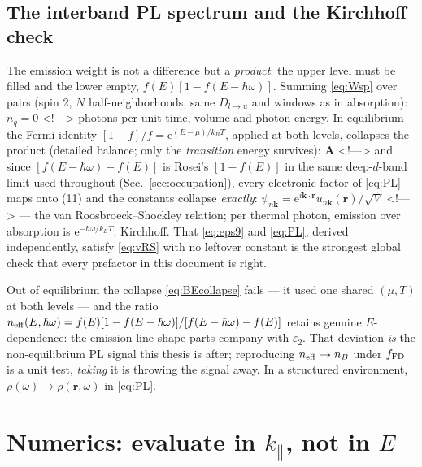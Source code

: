 \documentclass[11pt,a4paper]{article}
\numberwithin{equation}{section}
\begin{document}
\subsection{The interband PL spectrum and the Kirchhoff check}

The emission weight is not a difference but a \emph{product}: the
upper level must be filled and the lower empty,
${f}(E)[1-{f}(E-{\hbar\omega})]$.  Summing \eqref{eq:Wsp} over pairs (spin 2,
$N$ half-neighborhoods, same ${D_{l\to u}}$ and windows as in absorption):
$n_q=0$
<!--\label{eq:PL}-->
photons per unit time, volume and photon energy.  In equilibrium the
Fermi identity $[1-{f}]/{f}={\mathrm{e}}^{(E-\mu)/{k_B} T}$, applied at both
levels, collapses the product (detailed balance; only the
\emph{transition} energy survives):
$\mathbf A$
<!--\label{eq:BEcollapse}-->
and since $[{f}(E-{\hbar\omega})-{f}(E)]$ is Rosei's $[1-{f}(E)]$ in the same
deep-$d$-band limit used throughout (Sec.~\ref{sec:occupation}), every
electronic factor of \eqref{eq:PL} maps onto (11) and the constants
collapse \emph{exactly}:
$\psi_{n\mathbf k}={\mathrm{e}}^{i\mathbf k\cdot\mathbf r}
u_{n\mathbf k}(\mathbf r)/\sqrt V$
<!--\label{eq:vRS}-->
--- the van Roosbroeck--Shockley relation; per thermal photon,
emission over absorption is ${\mathrm{e}}^{-{\hbar\omega}/{k_B} T}$: Kirchhoff.  That
\eqref{eq:eps9} and \eqref{eq:PL}, derived independently, satisfy
\eqref{eq:vRS} with no leftover constant is the strongest global check
that every prefactor in this document is right.

Out of equilibrium the collapse \eqref{eq:BEcollapse} fails --- it
used one shared $(\mu,T)$ at both levels --- and the ratio
$n_{\rm eff}(E,{\hbar\omega})={f}(E)[1-{f}(E-{\hbar\omega})]/[{f}(E-{\hbar\omega})-{f}(E)]$
retains genuine $E$-dependence: the emission line shape parts company
with ${\varepsilon}_2$.  That deviation \emph{is} the non-equilibrium PL signal
this thesis is after; reproducing $n_{\rm eff}\to n_B$ under
${f}_{\rm FD}$ is a unit test, \emph{taking} it is throwing the
signal away.  In a structured environment,
$\rho(\omega)\to\rho(\mathbf r,\omega)$ in \eqref{eq:PL}.

\section{Numerics: evaluate in ${k_{\parallel}}$, not in $E$}\label{sec:numerics}
\end{document}
